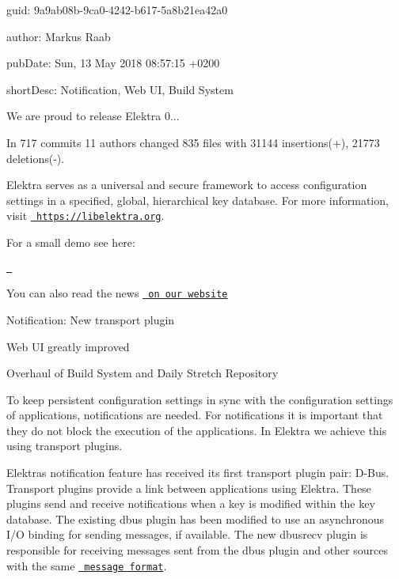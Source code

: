 
\begin{DoxyItemize}
\item guid\+: 9a9ab08b-\/9ca0-\/4242-\/b617-\/5a8b21ea42a0
\item author\+: Markus Raab
\item pub\+Date\+: Sun, 13 May 2018 08\+:57\+:15 +0200
\item short\+Desc\+: Notification, Web UI, Build System
\end{DoxyItemize}

We are proud to release Elektra 0...

In 717 commits 11 authors changed 835 files with 31144 insertions(+), 21773 deletions(-\/).

Elektra serves as a universal and secure framework to access configuration settings in a specified, global, hierarchical key database. For more information, visit \href{https://libelektra.org}{\texttt{ https\+://libelektra.\+org}}.

For a small demo see here\+:

\href{https://asciinema.org/a/cantr04assr4jkv8v34uz9b8r}{\texttt{ }}

You can also read the news \href{https://www.libelektra.org/news/0.8.23-release}{\texttt{ on our website}}


\begin{DoxyItemize}
\item Notification\+: New transport plugin
\item Web UI greatly improved
\item Overhaul of Build System and Daily Stretch Repository
\end{DoxyItemize}

To keep persistent configuration settings in sync with the configuration settings of applications, notifications are needed. For notifications it is important that they do not block the execution of the applications. In Elektra we achieve this using transport plugins.

Elektra\textquotesingle{}s notification feature has received its first transport plugin pair\+: D-\/\+Bus. Transport plugins provide a link between applications using Elektra. These plugins send and receive notifications when a key is modified within the key database. The existing {\ttfamily dbus} plugin has been modified to use an asynchronous I/O binding for sending messages, if available. The new {\ttfamily dbusrecv} plugin is responsible for receiving messages sent from the {\ttfamily dbus} plugin and other sources with the same \href{https://www.libelektra.org/plugins/dbus\#notification-format}{\texttt{ message format}}.

